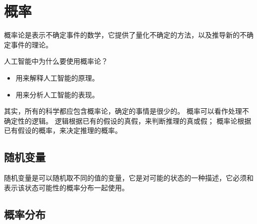 
\chapter{概率}

概率论是表示不确定事件的数学，它提供了量化不确定的方法，以及推导新的不确定事件的理论。

人工智能中为什么要使用概率论？

\begin{itemize}
\item 用来解释人工智能的原理。
\item 用来分析人工智能的表现。
\end{itemize}


\begin{tcolorbox}
  其实，所有的科学都应包含概率论，确定的事情是很少的。
  概率可以看作处理不确定性的逻辑。
  逻辑根据已有的假设的真假，来判断推理的真或假；
  概率论根据已有假设的概率，来决定推理的概率。
\end{tcolorbox}


\section{随机变量}
随机变量是可以随机取不同的值的变量，它是对可能的状态的一种描述，它必须和表示该状态可能性的概率分布一起使用。

\section{概率分布}





